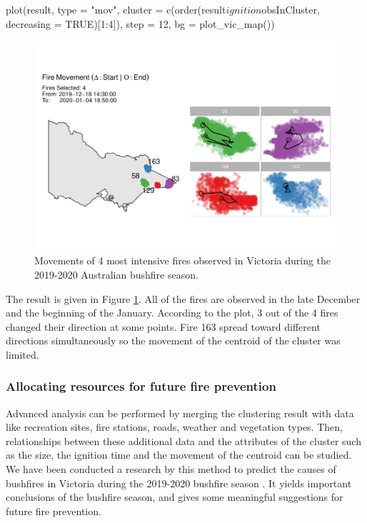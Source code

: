 \begin{Schunk}
\begin{Sinput}
plot(result, 
     type = "mov", 
     cluster = c(order(result$ignition$obsInCluster, 
                       decreasing = TRUE)[1:4]), 
     step = 12, 
     bg = plot_vic_map())
\end{Sinput}
\begin{figure}

{\centering \includegraphics[width=0.8\linewidth]{clustering_paper_files/figure-latex/firemovem-1} 

}

\caption[Movements of 4 most intensive fires observed in Victoria during the 2019-2020 Australian bushfire season]{Movements of 4 most intensive fires observed in Victoria during the 2019-2020 Australian bushfire season.}\label{fig:firemovem}
\end{figure}
\end{Schunk}

The result is given in Figure \ref{fig:firemovem}. All of the fires are
observed in the late December and the beginning of the January.
According to the plot, 3 out of the 4 fires changed their direction at
some points. Fire 163 spread toward different directions simultaneously
so the movement of the centroid of the cluster was limited.

\hypertarget{allocating-resources-for-future-fire-prevention}{%
\subsubsection{Allocating resources for future fire
prevention}\label{allocating-resources-for-future-fire-prevention}}

Advanced analysis can be performed by merging the clustering result with
data like recreation sites, fire stations, roads, weather and vegetation
types. Then, relationships between these additional data and the
attributes of the cluster such as the size, the ignition time and the
movement of the centroid can be studied. We have been conducted a
research by this method to predict the causes of bushfires in Victoria
during the 2019-2020 bushfire season \citep{conart}. It yields important
conclusions of the bushfire season, and gives some meaningful
suggestions for future fire prevention.

